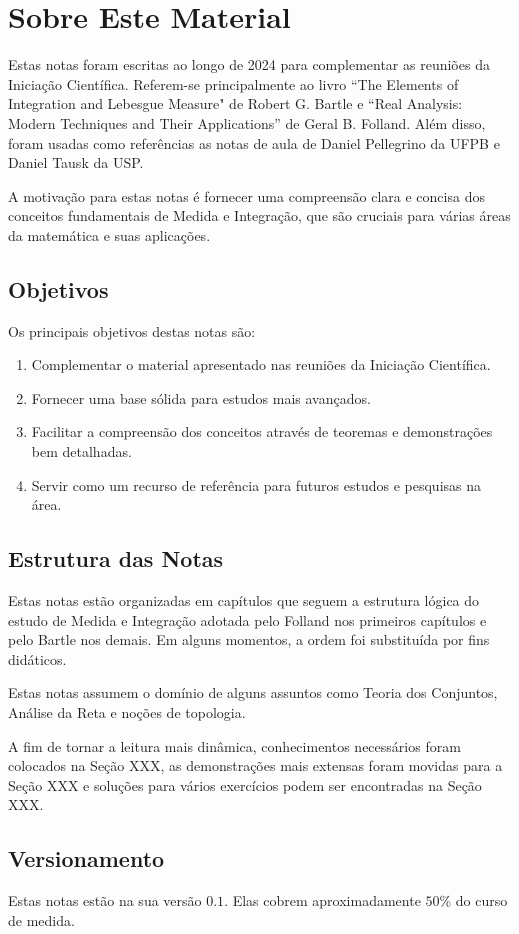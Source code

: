 \chapter*{Sobre Este Material}

Estas notas foram escritas ao longo de 2024 para complementar as reuniões da Iniciação Científica. Referem-se principalmente ao livro ``The Elements of Integration and Lebesgue Measure" de Robert G. Bartle e ``Real Analysis: Modern Techniques and Their Applications'' de Geral B. Folland. Além disso, foram usadas como referências as notas de aula de Daniel Pellegrino da UFPB e Daniel Tausk da USP.

A motivação para estas notas é fornecer uma compreensão clara e concisa dos conceitos fundamentais de Medida e Integração, que são cruciais para várias áreas da matemática e suas aplicações.

\section*{Objetivos}

Os principais objetivos destas notas são:

\begin{enumerate}
    \item Complementar o material apresentado nas reuniões da Iniciação Científica.
    \item Fornecer uma base sólida para estudos mais avançados.
    \item Facilitar a compreensão dos conceitos através de teoremas e demonstrações bem detalhadas.
    \item Servir como um recurso de referência para futuros estudos e pesquisas na área.
\end{enumerate}

\section*{Estrutura das Notas}

Estas notas estão organizadas em capítulos que seguem a estrutura lógica do estudo de Medida e Integração adotada pelo Folland nos primeiros capítulos e pelo Bartle nos demais. Em alguns momentos, a ordem foi substituída por fins didáticos.

Estas notas assumem o domínio de alguns assuntos como Teoria dos Conjuntos, Análise da Reta e noções de topologia.

A fim de tornar a leitura mais dinâmica, conhecimentos necessários foram colocados na Seção XXX, as demonstrações mais extensas foram movidas para a Seção XXX e soluções para vários exercícios podem ser encontradas na Seção XXX.

\section*{Versionamento}
Estas notas estão na sua versão $0.1$. Elas cobrem aproximadamente $50$\% do curso de medida.
